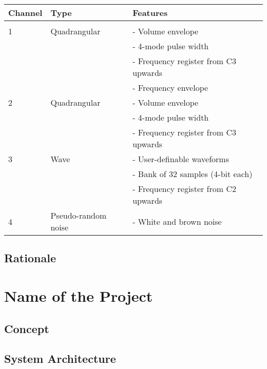 \documentclass[]{article}
\begin{document}
        \def\arraystretch{1.2}
        \begin{tabular}{l l l}
            \hline
            \textbf{Channel} & \textbf{Type} & \textbf{Features}\\
            \hline \\[-6pt]
            1 & Quadrangular\footnotemark & - Volume envelope\\
                &   &                                                                          - 4-mode pulse width\\
                &   &                                                                          - Frequency register from C3 upwards\\
                &   &                                                                          - Frequency envelope\\            
            \hline
            2 & Quadrangular & - Volume envelope\\       
            &   &              - 4-mode pulse width\\
            &   &              - Frequency register from C3 upwards\\
            \hline
            3 & Wave & - User-definable waveforms\\
            &   &      - Bank of 32 samples (4-bit each)\\
            &   &      - Frequency register from C2 upwards\\
            \hline
            4 & Pseudo-random noise & - White and brown noise\\
            \hline
        \end{tabular}
        
        \nocite{MARQUEZ2014}


    \subsection{Rationale} %


\section{Name of the Project} %
    \subsection{Concept}
    \subsection{System Architecture}
\end{document}
